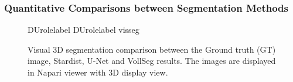 \documentclass[letterpaper,compsoc,twoside]{IEEEtran}
\providecommand*{\DUrole}[2]{%
  \ifcsname DUrole#1\endcsname%
    \csname DUrole#1\endcsname{#2}%
  \else%
    #2%
  \fi%
}
\newenvironment{DUlegend}{\small}{}
\begin{document}
\subsubsection{Quantitative Comparisons between Segmentation Methods%
  \label{quantitative-comparisons-between-segmentation-methods}%
}
\begin{figure}[]\noindent{}
\caption{Visual 3D segmentation comparison between the Ground truth (GT) image, Stardist, U-Net and VollSeg results. The images are displayed in Napari viewer with 3D display view.}
\begin{DUlegend}

\DUrole{label}{visseg}\end{DUlegend}
\end{figure}
\end{document}
